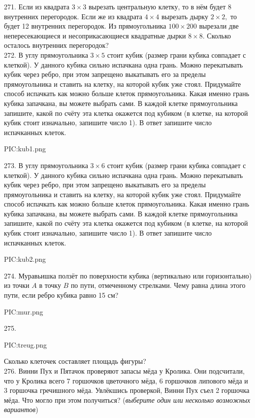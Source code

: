 271. Если из квадрата $3\times3$ вырезать центральную клетку, то в нём будет 8 внутренних перегородок. Если же из квадрата $4\times4$ вырезать дырку $2\times2,$ то будет 12 внутренних перегородок. Из прямоугольника $100\times200$ вырезали две непересекающиеся и несоприкасающиеся квадратные дырки $8\times8.$ Сколько осталось внутренних перегородок?\\
272. В углу прямоугольника $3\times5$ стоит кубик (размер грани кубика совпадает с клеткой). У данного кубика сильно испачкана одна грань. Можно перекатывать кубик через ребро, при этом запрещено выкатывать его за пределы прямоугольника и ставить на клетку, на которой кубик уже стоял. Придумайте способ испачкать как можно больше клеток прямоугольника. Какая именно грань кубика запачкана, вы можете выбрать сами. В каждой клетке прямоугольника запишите, какой по счёту эта клетка окажется под кубиком (в клетке, на которой кубик стоит изначально, запишите число 1). В ответ запишите число испачканных клеток.
\begin{center}
{{PIC:kub1.png}}
\end{center}
273. В углу прямоугольника $3\times6$ стоит кубик (размер грани кубика совпадает с клеткой). У данного кубика сильно испачкана одна грань. Можно перекатывать кубик через ребро, при этом запрещено выкатывать его за пределы прямоугольника и ставить на клетку, на которой кубик уже стоял. Придумайте способ испачкать как можно больше клеток прямоугольника. Какая именно грань кубика запачкана, вы можете выбрать сами. В каждой клетке прямоугольника запишите, какой по счёту эта клетка окажется под кубиком (в клетке, на которой кубик стоит изначально, запишите число 1). В ответ запишите число испачканных клеток.
\begin{center}
{{PIC:kub2.png}}
\end{center}
274. Муравьишка ползёт по поверхности кубика (вертикально или горизонтально) из точки $A$ в точку $B$ по пути, отмеченному стрелками. Чему равна длина этого пути, если ребро кубика равно 15 см?
\begin{center}
{{PIC:mur.png}}
\end{center}
275. \begin{center}
{{PIC:treug.png}}
\end{center}
Сколько клеточек составляет площадь фигуры?\\
276. Винни Пух и Пятачок проверяют запасы мёда у Кролика. Они подсчитали, что у Кролика всего 7 горшочков цветочного мёда, 6 горшочков липового мёда и 3 горшочка гречишного мёда. Увлёкшись проверкой, Винни Пух съел 2 горшочка мёда. Что могло при этом получиться? ({\it выберите один или несколько возможных вариантов})\\
